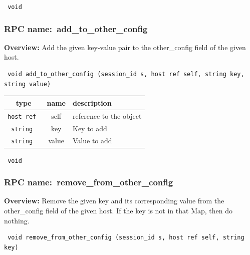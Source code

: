 {\tt 
void
}



\vspace{0.3cm}
\vspace{0.3cm}
\vspace{0.3cm}
\subsubsection{RPC name:~add\_to\_other\_config}

{\bf Overview:} 
Add the given key-value pair to the other\_config field of the given host.

\begin{verbatim} void add_to_other_config (session_id s, host ref self, string key, string value)\end{verbatim}



 
\vspace{0.3cm}
\begin{tabular}{|c|c|p{7cm}|}
 \hline
{\bf type} & {\bf name} & {\bf description} \\ \hline
{\tt host ref } & self & reference to the object \\ \hline 

{\tt string } & key & Key to add \\ \hline 

{\tt string } & value & Value to add \\ \hline 

\end{tabular}

\vspace{0.3cm}

{\tt 
void
}



\vspace{0.3cm}
\vspace{0.3cm}
\vspace{0.3cm}
\subsubsection{RPC name:~remove\_from\_other\_config}

{\bf Overview:} 
Remove the given key and its corresponding value from the other\_config
field of the given host.  If the key is not in that Map, then do nothing.

\begin{verbatim} void remove_from_other_config (session_id s, host ref self, string key)\end{verbatim}


